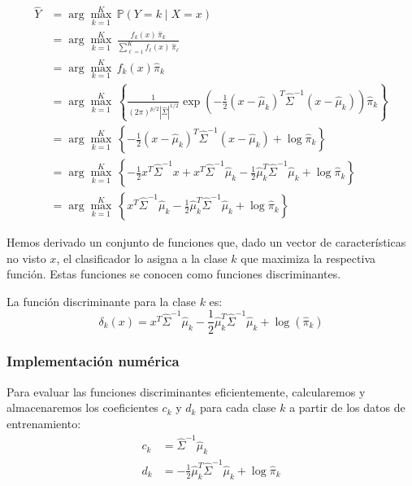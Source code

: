 \begin{align}
\hat{Y} &= \arg\max_{k=1}^K \, \mathbb{P}(Y = k \mid X = x) \nonumber \\
&= \arg\max_{k=1}^K \, \frac{f_k(x) \, \hat{\pi}_k}{\sum_{\ell=1}^K f_\ell(x) \, \hat{\pi}_\ell} \nonumber \\
&= \arg\max_{k=1}^K \, f_k(x) \hat{\pi}_k \nonumber \\
&= \arg\max_{k=1}^K \, \left\{\frac{1}{(2\pi)^{p/2} |\hat{\Sigma}|^{1/2}} \exp\left(-\frac{1}{2}(x - \hat{\mu}_k)^T \hat{\Sigma}^{-1} (x - \hat{\mu}_k)\right) \hat{\pi}_k\right\} \nonumber \\
&= \arg\max_{k=1}^K \, \left\{-\frac{1}{2}(x - \hat{\mu}_k)^T \hat{\Sigma}^{-1} (x - \hat{\mu}_k) + \log \hat{\pi}_k\right\} \label{eq:mahalanobis} \\
&= \arg\max_{k=1}^K \, \left\{-\frac{1}{2}x^T \hat{\Sigma}^{-1} x + x^T \hat{\Sigma}^{-1} \hat{\mu}_k - \frac{1}{2}\hat{\mu}_k^T \hat{\Sigma}^{-1} \hat{\mu}_k + \log \hat{\pi}_k\right\} \nonumber \\
&= \arg\max_{k=1}^K \, \left\{x^T \hat{\Sigma}^{-1} \hat{\mu}_k - \frac{1}{2}\hat{\mu}_k^T \hat{\Sigma}^{-1} \hat{\mu}_k + \log \hat{\pi}_k\right\} \nonumber
\end{align}

Hemos derivado un conjunto de funciones que, dado un vector de características no visto $x$, el clasificador lo asigna a la clase $k$ que maximiza la respectiva función. Estas funciones se conocen como funciones discriminantes.

\begin{definition}
La función discriminante para la clase $k$ es:
\[
\delta_k(x) = x^T \hat{\Sigma}^{-1} \hat{\mu}_k - \frac{1}{2} \hat{\mu}_k^T \hat{\Sigma}^{-1} \hat{\mu}_k + \log(\hat{\pi}_k)
\]
\end{definition}

\subsubsection{Implementación numérica}

Para evaluar las funciones discriminantes eficientemente, calcularemos y almacenaremos los coeficientes $c_k$ y $d_k$ para cada clase $k$ a partir de los datos de entrenamiento:
\begin{align*}
c_k &= \hat{\Sigma}^{-1} \hat{\mu}_k \\
d_k &= -\frac{1}{2} \hat{\mu}_k^T \hat{\Sigma}^{-1} \hat{\mu}_k + \log \hat{\pi}_k
\end{align*}

